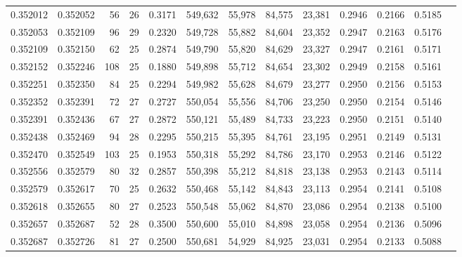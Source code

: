 \begin{tabular}{rrrrrrrrrrrrr}
0.352012 & 0.352052 &    56 &  26 &                                     0.3171 & 549,632 &  55,978 &  84,575 &  23,381 & 0.2946 & 0.2166 & 0.5185 \\
0.352053 & 0.352109 &    96 &  29 &                                     0.2320 & 549,728 &  55,882 &  84,604 &  23,352 & 0.2947 & 0.2163 & 0.5176 \\
0.352109 & 0.352150 &    62 &  25 &                                     0.2874 & 549,790 &  55,820 &  84,629 &  23,327 & 0.2947 & 0.2161 & 0.5171 \\
0.352152 & 0.352246 &   108 &  25 &                                     0.1880 & 549,898 &  55,712 &  84,654 &  23,302 & 0.2949 & 0.2158 & 0.5161 \\
0.352251 & 0.352350 &    84 &  25 &                                     0.2294 & 549,982 &  55,628 &  84,679 &  23,277 & 0.2950 & 0.2156 & 0.5153 \\
0.352352 & 0.352391 &    72 &  27 &                                     0.2727 & 550,054 &  55,556 &  84,706 &  23,250 & 0.2950 & 0.2154 & 0.5146 \\
0.352391 & 0.352436 &    67 &  27 &                                     0.2872 & 550,121 &  55,489 &  84,733 &  23,223 & 0.2950 & 0.2151 & 0.5140 \\
0.352438 & 0.352469 &    94 &  28 &                                     0.2295 & 550,215 &  55,395 &  84,761 &  23,195 & 0.2951 & 0.2149 & 0.5131 \\
0.352470 & 0.352549 &   103 &  25 &                                     0.1953 & 550,318 &  55,292 &  84,786 &  23,170 & 0.2953 & 0.2146 & 0.5122 \\
0.352556 & 0.352579 &    80 &  32 &                                     0.2857 & 550,398 &  55,212 &  84,818 &  23,138 & 0.2953 & 0.2143 & 0.5114 \\
0.352579 & 0.352617 &    70 &  25 &                                     0.2632 & 550,468 &  55,142 &  84,843 &  23,113 & 0.2954 & 0.2141 & 0.5108 \\
0.352618 & 0.352655 &    80 &  27 &                                     0.2523 & 550,548 &  55,062 &  84,870 &  23,086 & 0.2954 & 0.2138 & 0.5100 \\
0.352657 & 0.352687 &    52 &  28 &                                     0.3500 & 550,600 &  55,010 &  84,898 &  23,058 & 0.2954 & 0.2136 & 0.5096 \\
0.352687 & 0.352726 &    81 &  27 &                                     0.2500 & 550,681 &  54,929 &  84,925 &  23,031 & 0.2954 & 0.2133 & 0.5088 \\

\end{tabular}
